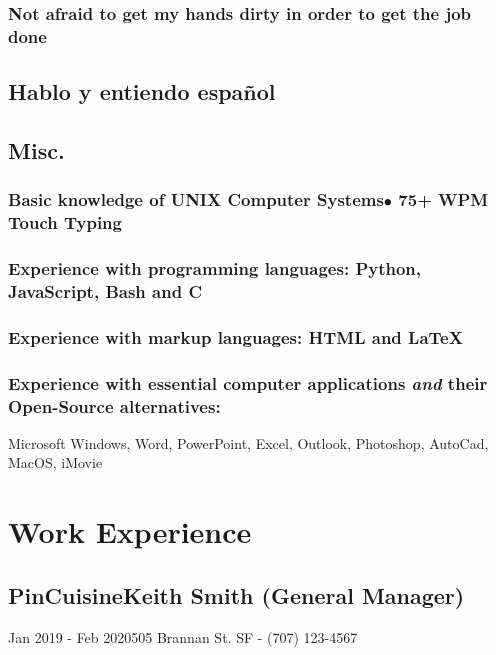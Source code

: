 \documentclass{article}
\begin{document}
\subsubsection{Not afraid to get my hands dirty in order to get the job done}

\subsection{Hablo y entiendo espa\~nol}

\subsection{Misc.}

\subsubsection{Basic knowledge of UNIX Computer Systems\hfill$\bullet$ 75+ WPM Touch Typing}

\subsubsection{Experience with programming languages: Python, JavaScript, Bash and C}
\subsubsection{Experience with markup languages: HTML and {\LaTeX}}

\subsubsection{Experience with essential computer applications \emph{and} their Open-Source alternatives:}

Microsoft Windows, Word, PowerPoint, Excel, Outlook, Photoshop, AutoCad, MacOS, iMovie

\section{Work Experience}

\subsection{PinCuisine\hfill Keith Smith (General Manager)}

\hspace{-.33in}Jan 2019 - Feb 2020\hfill 505 Brannan St. SF - (707) 123-4567
\end{document}
